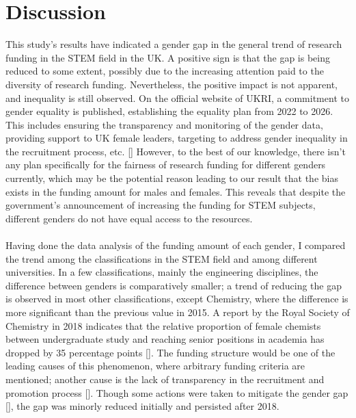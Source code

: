 \section{Discussion}

This study's results have indicated a gender gap in the general trend of research funding in the STEM field in the UK. A positive sign is that the gap is being reduced to some extent, possibly due to the increasing attention paid to the diversity of research funding. Nevertheless, the positive impact is not apparent, and inequality is still observed. On the official website of UKRI, a commitment to gender equality is published, establishing the equality plan from 2022 to 2026. This includes ensuring the transparency and monitoring of the gender data, providing support to UK female leaders, targeting to address gender inequality in the recruitment process, etc. [\cite{plan}] However, to the best of our knowledge, there isn't any plan specifically for the fairness of research funding for different genders currently, which may be the potential reason leading to our result that the bias exists in the funding amount for males and females. This reveals that despite the government's announcement of increasing the funding for STEM subjects, different genders do not have equal access to the resources. \\
\\
Having done the data analysis of the funding amount of each gender, I compared the trend among the classifications in the STEM field and among different universities. In a few classifications, mainly the engineering disciplines, the difference between genders is comparatively smaller; a trend of reducing the gap is observed in most other classifications, except Chemistry, where the difference is more significant than the previous value in 2015. A report by the Royal Society of Chemistry in 2018 indicates that the relative proportion of female chemists between undergraduate study and reaching senior positions in academia has dropped by 35 percentage points [\cite{RoyalChemistry}]. The funding structure would be one of the leading causes of this phenomenon, where arbitrary funding criteria are mentioned; another cause is the lack of transparency in the recruitment and promotion process [\cite{RoyalChemistry}]. Though some actions were taken to mitigate the gender gap [\cite{RSCFramework2023}], the gap was minorly reduced initially and persisted after 2018.\\
\\
